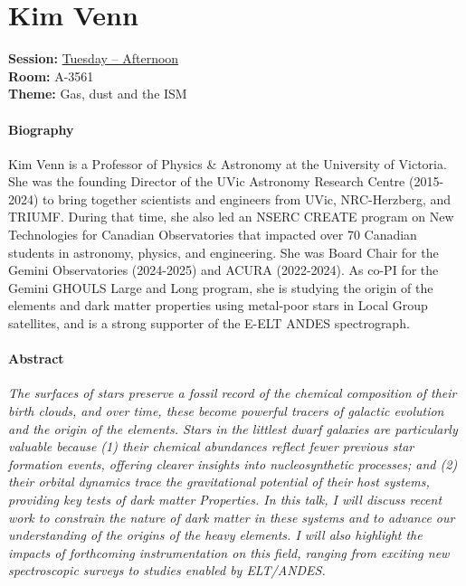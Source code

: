 \hypertarget{invited-kim-venn}{}
\label{invited-page-kim-venn}
\section{Kim Venn}
\textbf{Session:} \hyperlink{schedule-tuesday-afternoon-a-3561}{Tuesday -- Afternoon}\\
\textbf{Room:} A-3561\\
\textbf{Theme:} Gas, dust and the ISM\\

\paragraph{Biography}
{\sffamily
Kim Venn is a Professor of Physics \& Astronomy at the University of Victoria. She was the founding Director of the UVic Astronomy Research Centre (2015-2024) to bring together scientists and engineers from UVic, NRC-Herzberg, and TRIUMF. During that time, she also led an NSERC CREATE program on New Technologies for Canadian Observatories that impacted over 70 Canadian students in astronomy, physics, and engineering. She was Board Chair for the Gemini Observatories (2024-2025) and ACURA (2022-2024). As co-PI for the Gemini GHOULS Large and Long program, she is studying the origin of the elements and dark matter properties using metal-poor stars in Local Group satellites, and is a strong supporter of the E-ELT ANDES spectrograph.
}

\paragraph{Abstract}
{\itshape
The surfaces of stars preserve a fossil record
of the chemical composition of their birth clouds,
and over time, these become powerful tracers of
galactic evolution and the origin of the elements.
Stars in the littlest dwarf galaxies are particularly
valuable because (1) their chemical abundances reflect
fewer previous star formation events, offering clearer
insights into nucleosynthetic processes; and (2) their
orbital dynamics trace the gravitational potential of
their host systems, providing key tests of dark matter
Properties. In this talk, I will discuss recent work to
constrain the nature of dark matter in these systems
and to advance our understanding of the origins of the
heavy elements. I will also highlight the impacts of
forthcoming instrumentation on this field, ranging
from exciting new spectroscopic surveys to studies
enabled by ELT/ANDES.
}


